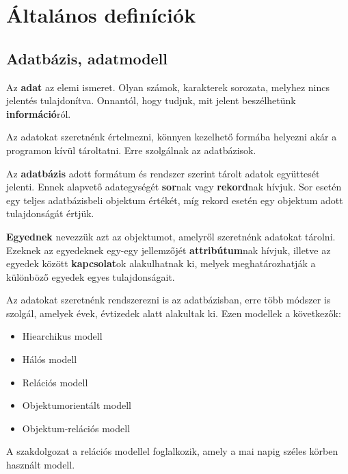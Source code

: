 \chapter{Általános definíciók \cite{adatb}}
\section{Adatbázis, adatmodell}

\begin{defi}[Adat]
Az \textbf{adat} az elemi ismeret. Olyan számok, karakterek sorozata, melyhez nincs jelentés tulajdonítva. Onnantól, hogy tudjuk, mit jelent beszélhetünk \textbf{információ}ról. 
\end{defi}

Az adatokat szeretnénk értelmezni, könnyen kezelhető formába helyezni akár a programon kívül tároltatni. Erre szolgálnak az adatbázisok.

\begin{defi}
Az \textbf{adatbázis} adott formátum és rendszer szerint tárolt adatok együttesét jelenti. Ennek alapvető adategységét \textbf{sor}nak vagy \textbf{rekord}nak hívjuk. Sor esetén egy teljes adatbázisbeli objektum értékét, míg rekord esetén egy objektum adott tulajdonságát értjük.
\end{defi}

\begin{defi}
\textbf{Egyednek} nevezzük azt az objektumot, amelyről szeretnénk adatokat tárolni. Ezeknek az egyedeknek egy-egy jellemzőjét \textbf{attribútum}nak hívjuk, illetve az egyedek között \textbf{kapcsolat}ok alakulhatnak ki, melyek meghatározhatják a különböző egyedek egyes tulajdonságait.
\end{defi}

Az adatokat szeretnénk rendszerezni is az adatbázisban, erre több módszer is szolgál, amelyek évek, évtizedek alatt alakultak ki. Ezen modellek a következők:
\begin{itemize}
    \item Hiearchikus modell
    \item Hálós modell
    \item Relációs modell
    \item Objektumorientált modell
    \item Objektum-relációs modell
\end{itemize}
A szakdolgozat a relációs modellel foglalkozik, amely a mai napig széles körben használt modell.


